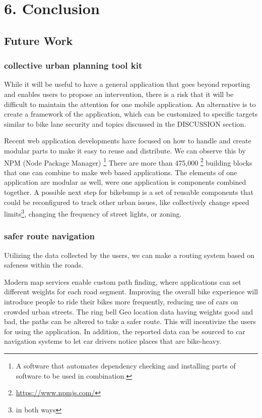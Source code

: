 \chapter{6. Conclusion}

\section{Future Work}
\label{sec:future}

\subsection{collective urban planning tool kit}

While it will be useful to have a general application that goes beyond reporting and enables users to propose an intervention,
there is a risk that it will be difficult to maintain the attention for one mobile application.
An alternative is to create a framework of the application, which can be customized to specific
targets similar to bike lane security and topics discussed in the DISCUSSION section.


Recent web application developments have focused on how to handle and create modular parts to make it easy to reuse and distribute. We can observe this by NPM (Node Package Manager)
\footnote{A software that automates dependency checking and installing parts of software to be used in combination.}
There are more than 475,000
\footnote{\url{https://www.npmjs.com/}}
building blocks that one can combine to make web based applications. The elements of one application are modular as well, were one application is components combined together.
A possible next step for bikebump is a set of reusable components that could be reconfigured to track other urban issues, like collectively change speed limits\footnote{in both ways}, changing the frequency of street lights, or zoning.

\subsection{safer route navigation}
Utilizing the data collected by the users, we can make a routing system based on safeness within the roads.

Modern map services enable custom path finding, where applications can set different weights for each road segment. Improving the overall bike experience will introduce people to ride their bikes more frequently, reducing use of cars on crowded urban streets. 
The ring bell Geo location data having weights good and bad, the paths can be altered to take a safer route.
This will incentivize the users for using the application. In addition, the reported data can be sourced to car navigation systems to let car drivers notice places that are bike-heavy.


